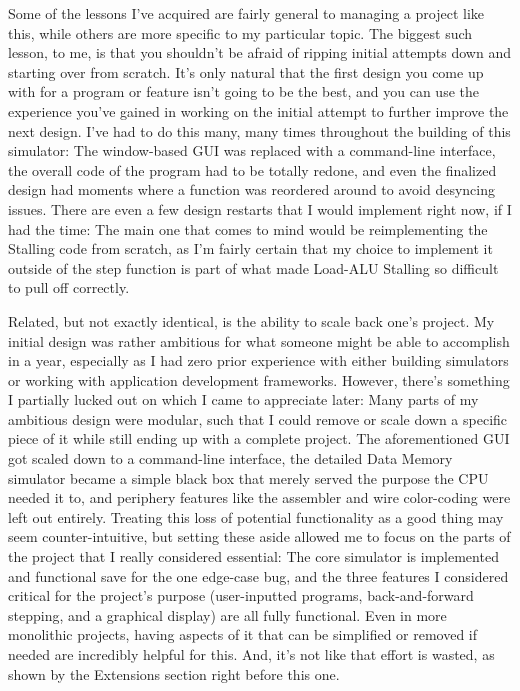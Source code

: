 \documentclass[12pt,twoside]{reedthesis}
\begin{document}
Some of the lessons I've acquired are fairly general to managing a project like this, while others are more specific to my particular topic. The biggest such lesson, to me, is that you shouldn't be afraid of ripping initial attempts down and starting over from scratch. It's only natural that the first design you come up with for a program or feature isn't going to be the best, and you can use the experience you've gained in working on the initial attempt to further improve the next design. I've had to do this many, many times throughout the building of this simulator: The window-based GUI was replaced with a command-line interface, the overall code of the program had to be totally redone, and even the finalized design had moments where a function was reordered around to avoid desyncing issues. There are even a few design restarts that I would implement right now, if I had the time: The main one that comes to mind would be reimplementing the Stalling code from scratch, as I'm fairly certain that my choice to implement it outside of the step function is part of what made Load-ALU Stalling so difficult to pull off correctly.

Related, but not exactly identical, is the ability to scale back one's project. My initial design was rather ambitious for what someone might be able to accomplish in a year, especially as I had zero prior experience with either building simulators or working with application development frameworks. However, there's something I partially lucked out on which I came to appreciate later: Many parts of my ambitious design were modular, such that I could remove or scale down a specific piece of it while still ending up with a complete project. The aforementioned GUI got scaled down to a command-line interface, the detailed Data Memory simulator became a simple black box that merely served the purpose the CPU needed it to, and periphery features like the assembler and wire color-coding were left out entirely. Treating this loss of potential functionality as a good thing may seem counter-intuitive, but setting these aside allowed me to focus on the parts of the project that I really considered essential: The core simulator is implemented and functional save for the one edge-case bug, and the three features I considered critical for the project's purpose (user-inputted programs, back-and-forward stepping, and a graphical display) are all fully functional. Even in more monolithic projects, having aspects of it that can be simplified or removed if needed are incredibly helpful for this. And, it's not like that effort is wasted, as shown by the Extensions section right before this one.
\end{document}
